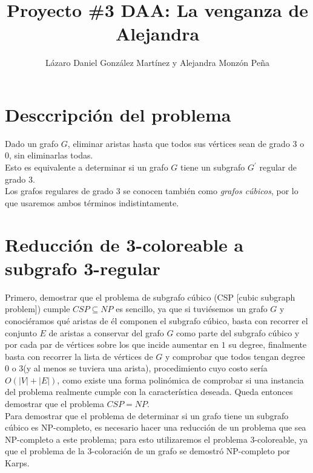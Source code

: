 \documentclass{article}
\begin{document}
\title{\textbf{Proyecto \#3 DAA:} La venganza de Alejandra}
\author{L\'azaro Daniel Gonz\'alez Mart\'inez y Alejandra Monz\'on Pe\~na}

\date{}
\maketitle

\section*{Desccripci\'on del problema}
Dado un grafo $G$, eliminar aristas hasta que todos sus v\'ertices sean de grado $3$ o $0$, sin eliminarlas todas.\\ 

Esto es equivalente a determinar si un grafo $G$ tiene un subgrafo $G^{'}$ regular de grado $3$. \\

Los grafos regulares de grado $3$ se conocen tambi\'en como \textit{grafos c\'ubicos}, por lo que usaremos ambos t\'erminos indistintamente.

\section*{Reducci\'on de 3-coloreable a subgrafo 3-regular}
Primero, demostrar que el problema de subgrafo c\'ubico (CSP [cubic subgraph problem]) cumple $ CSP \subseteq NP$ es sencillo, ya que si tuvi\'esemos un grafo $G$ y conoci\'eramos 
qué aristas de \'el componen el subgrafo c\'ubico, basta con recorrer el conjunto $E$ de aristas a conservar del grafo $G$ como parte del subgrafo c\'ubico 
y por cada par de v\'ertices sobre los que incide aumentar en $1$ su degree, finalmente basta con recorrer la lista de v\'ertices de $G$ y comprobar que todos tengan degree 
$0$ o  $3$(y al menos se tuviera una arista), procedimiento cuyo costo ser\'ia $O(|V| + |E|)$, como existe una forma polin\'omica de comprobar si una instancia del problema realmente cumple con 
la caracter\'istica deseada. Queda entonces demostrar que el problema $CSP = NP$.\\

Para demostrar que el problema de determinar si un grafo tiene un subgrafo c\'ubico es NP-completo, es necesario hacer una reducci\'on de un problema que sea NP-completo 
a este problema; para esto utilizaremos el problema $3$-coloreable, ya que el problema de la 3-coloraci\'on de un grafo se demostr\'o NP-completo por Karps.\\
\end{document}
